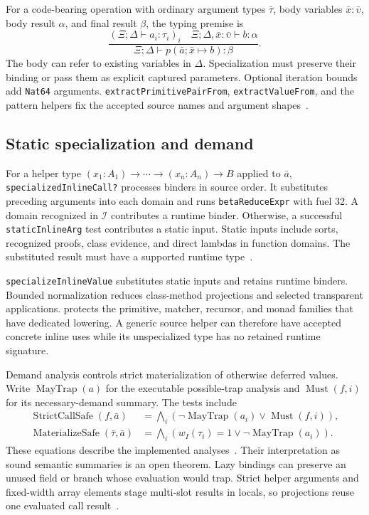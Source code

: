 \documentclass[11pt]{article}
\newcommand{\code}[1]{\texttt{#1}}
\newcommand{\longcode}[1]{\texttt{\seqsplit{#1}}}
\newcommand{\I}{\mathcal{I}}
\begin{document}
For a code-bearing operation with ordinary argument types $\bar\tau$, body variables $\bar x:\bar\upsilon$, body result $\alpha$, and final result $\beta$, the typing premise is
\[
\frac{(\Xi;\Delta\vdash a_i:\tau_i)_i\quad
       \Xi;\Delta,\bar x:\bar\upsilon\vdash b:\alpha}
      {\Xi;\Delta\vdash p(\bar a;\bar x\mapsto b):\beta}.
\]
The body can refer to existing variables in $\Delta$.  Specialization must preserve their binding or pass them as explicit captured parameters.  Optional iteration bounds add \code{Nat64} arguments.  \code{extractPrimitivePairFrom}, \code{extractValueFrom}, and the pattern helpers fix the accepted source names and argument shapes~\cite{extract,patterns}.

\subsection{Static specialization and demand}

For a helper type $(x_1:A_1)\to\cdots\to(x_n:A_n)\to B$ applied to $\bar a$, \code{specializedInlineCall?} processes binders in source order.  It substitutes preceding arguments into each domain and runs \code{betaReduceExpr} with fuel 32.  A domain recognized in $\I$ contributes a runtime binder.  Otherwise, a successful \code{staticInlineArg} test contributes a static input.  Static inputs include sorts, recognized proofs, class evidence, and direct lambdas in function domains.  The substituted result must have a supported runtime type~\cite{types}.

\code{specializeInlineValue} substitutes static inputs and retains runtime binders.  Bounded normalization reduces class-method projections and selected transparent applications.  \longcode{blocksTransparentSpecialization} protects the primitive, matcher, recursor, and monad families that have dedicated lowering.  A generic source helper can therefore have accepted concrete inline uses while its unspecialized type has no retained runtime signature.

Demand analysis controls strict materialization of otherwise deferred values.  Write $\operatorname{MayTrap}(a)$ for the executable possible-trap analysis and $\operatorname{Must}(f,i)$ for its necessary-demand summary.  The tests include
\begin{align*}
\operatorname{StrictCallSafe}(f,\bar a)
  &=\bigwedge_i(\neg\operatorname{MayTrap}(a_i)\lor\operatorname{Must}(f,i)),\\
\operatorname{MaterializeSafe}(\bar\tau,\bar a)
  &=\bigwedge_i(w_I(\tau_i)=1\lor\neg\operatorname{MayTrap}(a_i)).
\end{align*}
These equations describe the implemented analyses~\cite{demand}.  Their interpretation as sound semantic summaries is an open theorem.  Lazy bindings can preserve an unused field or branch whose evaluation would trap.  Strict helper arguments and fixed-width array elements stage multi-slot results in locals, so projections reuse one evaluated call result~\cite{storage,extract}.
\end{document}
